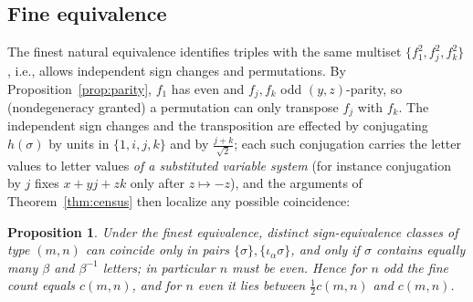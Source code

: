 \documentclass[11pt]{article}
\newtheorem{proposition}[theorem]{Proposition}
\theoremstyle{definition}
\theoremstyle{remark}
\newcommand{\ia}{\iota_\alpha}
\begin{document}
\subsection{Fine equivalence}\label{sec:fine}
The finest natural equivalence identifies triples with the same multiset $\{f_1^2,f_j^2,f_k^2\}$, i.e., allows independent sign changes and permutations. By Proposition~\ref{prop:parity}, $f_1$ has even and $f_j,f_k$ odd $(y,z)$-parity, so (nondegeneracy granted) a permutation can only transpose $f_j$ with $f_k$. The independent sign changes and the transposition are effected by conjugating $h(\sigma)$ by units in $\{1,i,j,k\}$ and by $\frac{j+k}{\sqrt2}$; each such conjugation carries the letter values to letter values \emph{of a substituted variable system} (for instance conjugation by $j$ fixes $x+yj+zk$ only after $z\mapsto-z$), and the arguments of Theorem~\ref{thm:census} then localize any possible coincidence:

\begin{proposition}\label{prop:fine}
Under the finest equivalence, distinct sign-equivalence classes of type $(m,n)$ can coincide only in pairs $\{\sigma\},\{\ia\sigma\}$, and only if $\sigma$ contains equally many $\beta$ and $\beta^{-1}$ letters; in particular $n$ must be even. Hence for $n$ odd the fine count equals $c(m,n)$, and for $n$ even it lies between $\tfrac12c(m,n)$ and $c(m,n)$.
\end{proposition}
\end{document}
